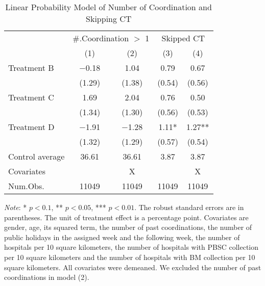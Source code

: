 \documentclass[12pt, a4paper]{article}
\begin{document}
\begin{table}[H]

\caption{\label{tab:lm-skip}Linear Probability Model of Number of Coordination and Skipping CT}
\centering
\fontsize{8}{10}\selectfont
\begin{threeparttable}
\begin{tabular}[t]{lcccc}
\toprule
\multicolumn{1}{c}{ } & \multicolumn{2}{c}{\#.Coordination $>$ 1} & \multicolumn{2}{c}{Skipped CT} \\
\cmidrule(l{3pt}r{3pt}){2-3} \cmidrule(l{3pt}r{3pt}){4-5}
  & (1) & (2) & (3) & (4)\\
\midrule
Treatment B & \num{-0.18} & \num{1.04} & \num{0.79} & \num{0.67}\\
 & (\num{1.29}) & (\num{1.38}) & (\num{0.54}) & (\num{0.56})\\
Treatment C & \num{1.69} & \num{2.04} & \num{0.76} & \num{0.50}\\
 & (\num{1.34}) & (\num{1.30}) & (\num{0.56}) & (\num{0.53})\\
Treatment D & \num{-1.91} & \num{-1.28} & \num{1.11}* & \num{1.27}**\\
 & (\num{1.32}) & (\num{1.29}) & (\num{0.57}) & (\num{0.54})\\
\midrule
Control average & 36.61 & 36.61 & 3.87 & 3.87\\
Covariates &  & X &  & X\\
Num.Obs. & \num{11049} & \num{11049} & \num{11049} & \num{11049}\\
\bottomrule
\end{tabular}
\begin{tablenotes}
\item \emph{Note}: * $p < 0.1$, ** $p < 0.05$, *** $p < 0.01$. The robust standard errors are in parentheses. The unit of treatment effect is a percentage point. Covariates are gender, age, its squared term, the number of past coordinations, the number of public holidays in the assigned week and the following week, the number of hospitals per 10 square kilometers, the number of hospitals with PBSC collection per 10 square kilometers and the number of hospitals with BM collection per 10 square kilometers. All covariates were demeaned. We excluded the number of past coordinations in model (2).
\end{tablenotes}
\end{threeparttable}
\end{table}
\end{document}
